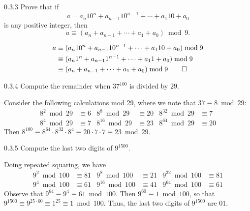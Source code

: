\begin{exercise}{0.3.3}
    Prove that if
    \[
    	a = a_n 10^n + a_{n - 1}10^{n - 1} + \cdots + a_1 10 + a_0
    \]
    is any positive integer, then
    \[
    	a \equiv (a_n + a_{n - 1} + \cdots + a_1 + a_0) \bmod 9.
    \]

\end{exercise}

\begin{sol}
    \begin{align*}
        a & \equiv (a_n10^n + a_{n - 1}10^{n - 1} + \cdots + a_110 + a_0) \bmod 9 \\
        & \equiv (a_n1^n + a_{n - 1}1^{n - 1} + \cdots + a_11 + a_0) \bmod 9 \\
        & \equiv (a_n + a_{n - 1} + \cdots + a_1 + a_0) \bmod 9 \qedhere
    \end{align*}
\end{sol}

\begin{exercise}{0.3.4}
    Compute the remainder when $37^{100}$ is divided by $29$.
\end{exercise}

\begin{sol}
    Consider the following calculations mod 29, where we note that $37 \equiv 8 \bmod 29$:
    \begin{align*}
        8^2 \bmod 29 & \equiv 6 & 8^8 \bmod 29 & \equiv 20 & 8^{32} \bmod 29 & \equiv 7 \\
        8^4 \bmod 29 & \equiv 7 & 8^{16} \bmod 29 & \equiv 23 & 8^{64} \bmod 29 & \equiv 20
    \end{align*}
    Then $8^{100} \equiv 8^{64} \cdot 8^{32} \cdot 8^4 \equiv 20 \cdot 7 \cdot 7 \equiv 23 \bmod 29$.
\end{sol}

\begin{exercise}{0.3.5}
    Compute the last two digits of $9^{1500}$.

\end{exercise}

\begin{sol}
    Doing repeated squaring, we have
    \begin{align*}
        9^2 \bmod 100 & \equiv 81 & 9^8 \bmod 100 & \equiv 21 & 9^{32} \bmod 100 & \equiv 81 \\
        9^4 \bmod 100 & \equiv 61 & 9^{16} \bmod 100 & \equiv 41 & 9^{64} \bmod 100 & \equiv 61
    \end{align*}
    Observe that $9^{64} \equiv 9^4 \equiv 61 \bmod 100$.
	Then $9^{60} \equiv 1 \bmod 100$, so that $9^{1500} \equiv 9^{25 \cdot 60} \equiv 1^{25} \equiv 1 \bmod 100$.
	Thus, the last two digits of $9^{1500}$ are $01$.
\end{sol}


